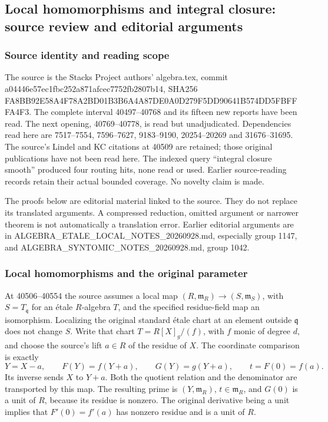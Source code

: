 \subsection{Local homomorphisms and integral closure: source review and editorial arguments}\label{algebra-proof-054-local-homomorphisms-and-integral-closure-source-review-and-editorial-arguments}

\subsubsection{Source identity and reading scope}\label{algebra-proof-054-source-identity-and-reading-scope}

The source is the Stacks Project authors' algebra.tex, commit a04446e57ec1fbc252a871afcec7752fb2807b14, SHA256 FA8BB92E58A4F78A2BD01B3B6A4A87DE0A0D279F5DD90641B574DD5FBFFFA4F3. The complete interval 40497--40768 and its fifteen new reports have been read. The next opening, 40769--40778, is read but unadjudicated. Dependencies read here are 7517--7554, 7596--7627, 9183--9190, 20254--20269 and 31676--31695. The source's Lindel and KC citations at 40509 are retained; those original publications have not been read here. The indexed query ``integral closure smooth'' produced four routing hits, none read or used. Earlier source-reading records retain their actual bounded coverage. No novelty claim is made.

The proofs below are editorial material linked to the source. They do not replace its translated arguments. A compressed reduction, omitted argument or narrower theorem is not automatically a translation error. Earlier editorial arguments are in ALGEBRA\_ETALE\_LOCAL\_NOTES\_20260928.md, especially group 1147, and ALGEBRA\_SYNTOMIC\_NOTES\_20260928.md, group 1042.

\subsubsection{Local homomorphisms and the original parameter}\label{algebra-proof-054-local-homomorphisms-and-the-original-parameter}

At 40506--40554 the source assumes a local map \((R,\mathfrak m_R)\to(S,\mathfrak m_S)\), with \(S=T_{\mathfrak q}\) for an étale \(R\)-algebra \(T\), and the specified residue-field map an isomorphism. Localizing the original standard étale chart at an element outside \(\mathfrak q\) does not change \(S\). Write that chart \(T=R[X]_g/(f)\), with \(f\) monic of degree \(d\), and choose the source's lift \(a\in R\) of the residue of \(X\). The coordinate comparison is exactly \[
Y=X-a,\qquad F(Y)=f(Y+a),\qquad G(Y)=g(Y+a),\qquad
t=F(0)=f(a).
\] Its inverse sends \(X\) to \(Y+a\). Both the quotient relation and the denominator are transported by this map. The resulting prime is \((Y,\mathfrak m_R)\), \(t\in\mathfrak m_R\), and \(G(0)\) is a unit of \(R\), because its residue is nonzero. The original derivative being a unit implies that \(F'(0)=f'(a)\) has nonzero residue and is a unit of \(R\).

